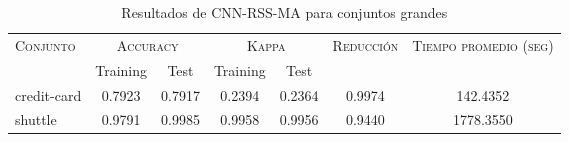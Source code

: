 \begin{table}[]
\centering
\begin{tabular}{l c c c c c c}
\hline
\multirow{2}{*}{\textsc{Conjunto}}
	& \multicolumn{2}{c}{\textsc{Accuracy}}
	& \multicolumn{2}{c}{\textsc{Kappa}}
	& \textsc{Reducción}
	& \textsc{Tiempo promedio (seg)} \\
	& Training & Test
	& Training & Test \\ 
\hline
\hline

credit-card & 0.7923 & 0.7917 & 0.2394 & 0.2364 & 0.9974 & 142.4352 \\
shuttle & 0.9791 & 0.9985 & 0.9958 & 0.9956 & 0.9440 & 1778.3550 \\

\hline
\end{tabular}
\caption{Resultados de CNN-RSS-MA para conjuntos grandes }
\label{res-grande-CNN-RSS-MA}
\end{table}

